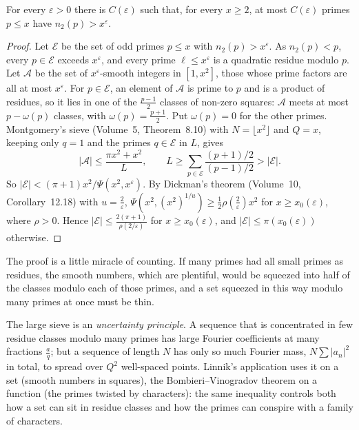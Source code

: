 \begin{theorem}[Linnik, 1941]\label{thm:linnik}
For every $\varepsilon>0$ there is $C(\varepsilon)$ such that, for every $x\ge2$, at most $C(\varepsilon)$ primes $p\le x$ have $n_2(p)>x^\varepsilon$.
\end{theorem}
\begin{proof}
Let $\mathcal E$ be the set of odd primes $p\le x$ with $n_2(p)>x^\varepsilon$. As $n_2(p)<p$, every $p\in\mathcal E$ exceeds $x^\varepsilon$, and every prime $\ell\le x^\varepsilon$ is a quadratic residue modulo $p$. Let $\mathcal A$ be the set of $x^\varepsilon$-smooth integers in $[1,x^2]$, those whose prime factors are all at most $x^\varepsilon$. For $p\in\mathcal E$, an element of $\mathcal A$ is prime to $p$ and is a product of residues, so it lies in one of the $\frac{p-1}2$ classes of non-zero squares: $\mathcal A$ meets at most $p-\omega(p)$ classes, with $\omega(p)=\frac{p+1}2$. Put $\omega(p)=0$ for the other primes. Montgomery's sieve (Volume~5, Theorem~8.10) with $N=\lfloor x^2\rfloor$ and $Q=x$, keeping only $q=1$ and the primes $q\in\mathcal E$ in $L$, gives
\[
|\mathcal A|\le\frac{\pi x^2+x^2}L,\qquad L\ge\sum_{p\in\mathcal E}\frac{(p+1)/2}{(p-1)/2}>|\mathcal E|.
\]
So $|\mathcal E|<(\pi+1)x^2/\Psi(x^2,x^\varepsilon)$. By Dickman's theorem (Volume~10, Corollary~12.18) with $u=\frac2\varepsilon$, $\Psi(x^2,(x^2)^{1/u})\ge\frac12\rho(\frac2\varepsilon)x^2$ for $x\ge x_0(\varepsilon)$, where $\rho>0$. Hence $|\mathcal E|\le\frac{2(\pi+1)}{\rho(2/\varepsilon)}$ for $x\ge x_0(\varepsilon)$, and $|\mathcal E|\le\pi(x_0(\varepsilon))$ otherwise.
\end{proof}

The proof is a little miracle of counting. If many primes had all small primes as residues, the smooth numbers, which are plentiful, would be squeezed into half of the classes modulo each of those primes, and a set squeezed in this way modulo many primes at once must be thin.

\begin{beauty}
The large sieve is an \emph{uncertainty principle}. A sequence that is concentrated in few residue classes modulo many primes has large Fourier coefficients at many fractions $\frac aq$; but a sequence of length $N$ has only so much Fourier mass, $N\sum|a_n|^2$ in total, to spread over $Q^2$ well-spaced points. Linnik's application uses it on a set (smooth numbers in squares), the Bombieri--Vinogradov theorem on a function (the primes twisted by characters): the same inequality controls both how a set can sit in residue classes and how the primes can conspire with a family of characters.
\end{beauty}

